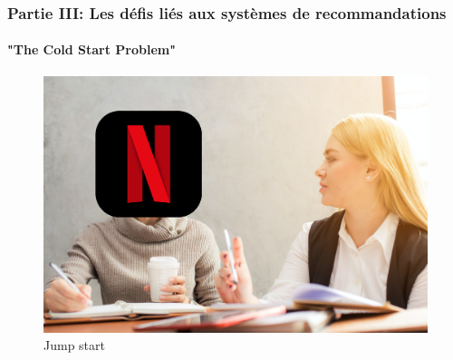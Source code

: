 \begin{frame}

    \frametitle{Partie III: Les défis liés aux systèmes de recommandations}
    \framesubtitle{"The Cold Start Problem"}

    \begin{figure}
        \centering
        \includegraphics[totalheight=5.5cm]{Images/PartieIII/NetflixAsking.png}
        \caption{Jump start}
    \end{figure}

\end{frame}